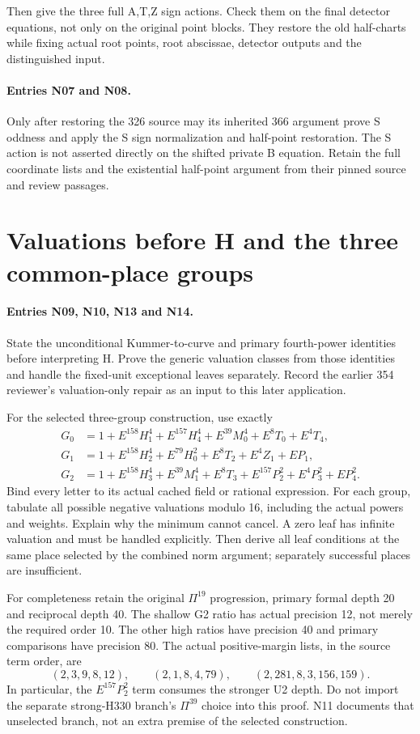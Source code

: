\documentclass{article}
\begin{document}
Then give the three full A,T,Z sign actions. Check them on the final
detector equations, not only on the original point blocks. They restore
the old half-charts while fixing actual root points, root abscissae,
detector outputs and the distinguished input.

\paragraph{Entries N07 and N08.}
Only after restoring the 326 source may its inherited 366 argument prove
S oddness and apply the S sign normalization and half-point restoration.
The S action is not asserted directly on the shifted private B equation.
Retain the full coordinate lists and the existential half-point argument
from their pinned source and review passages.

\section{Valuations before H and the three common-place groups}
\label{outline:detectors}
\paragraph{Entries N09, N10, N13 and N14.}
State the unconditional Kummer-to-curve and primary fourth-power
identities before interpreting H. Prove the generic valuation classes
from those identities and handle the fixed-unit exceptional leaves
separately. Record the earlier 354 reviewer's valuation-only repair
as an input to this later application.

For the selected three-group construction, use exactly
\begin{align*}
 G_0&=1+E^{158}H_1^4+E^{157}H_4^4+E^{39}M_0^4+E^8T_0+E^4T_4,\\
 G_1&=1+E^{158}H_2^4+E^{79}H_0^2+E^8T_2+E^4Z_1+EP_1,\\
 G_2&=1+E^{158}H_3^4+E^{39}M_1^4+E^8T_3+E^{157}P_2^2+E^4P_3^2+EP_4^2.
\end{align*}
Bind every letter to its actual cached field or rational expression.
For each group, tabulate all possible negative valuations modulo 16,
including the actual powers and weights. Explain why the minimum cannot
cancel. A zero leaf has infinite valuation and must be handled explicitly.
Then derive all leaf conditions at the same place selected by the
combined norm argument; separately successful places are insufficient.

For completeness retain the original $\Pi^{19}$ progression, primary
formal depth 20 and reciprocal depth 40. The shallow G2 ratio has actual
precision 12, not merely the required order 10. The other high ratios
have precision 40 and primary comparisons have precision 80.
The actual positive-margin lists, in the source term order, are
\[
 (2,3,9,8,12),\qquad (2,1,8,4,79),\qquad
 (2,281,8,3,156,159).
\]
In particular, the $E^{157}P_2^2$ term consumes the stronger U2 depth.
Do not import the separate strong-H330 branch's $\Pi^{39}$ choice into
this proof. N11 documents that unselected branch, not an extra premise
of the selected construction.
\end{document}

